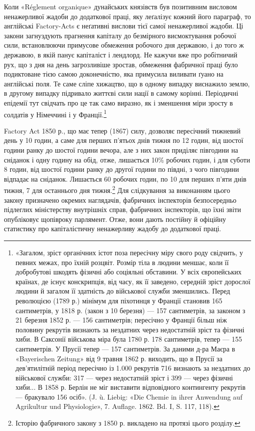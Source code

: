 Коли «Réglement organique» дунайських князівств був позитивним
висловом ненажерливої жадоби до додаткової праці, яку
леґалізує кожний його параграф, то англійські Factory-Acts
є неґативні вислови тієї самої ненажерливої жадоби. Ці закони
загнуздують прагнення капіталу до безмірного висмоктування
робочої сили, встановлюючи примусове обмеження робочого дня
державою, і до того ж державою, в якій панує капіталіст і лендлорд.
Не кажучи вже про робітничий рух, що з дня на день загрозливіше
зростав, обмеження фабричної праці було подиктоване
тією самою доконечністю, яка примусила виливати ґуано
на англійські поля. Те саме сліпе хижацтво, що в одному випадку
виснажило землю, в другому випадку підривало життєві сили
нації в самому корінні. Періодичні епідемії тут свідчать про це
так само виразно, як і зменшення міри зросту в солдатів у Німеччині
і у Франції.\footnote{
«Загалом, зріст органічних істот поза пересічну міру свого роду
свідчить, у певних межах, про їхній розцвіт. Розмір тіла в людини меншає,
коли її добробутові шкодять фізичні або соціяльні обставини. У всіх європейських
країнах, де існує конскрипція, від часу, як її заведено, середній
зріст дорослої людини й загалом її здатність до військової служби зменшились.
Перед революцією (1789 р.) мінімум для піхотинця у Франції
становив 165 сантиметрів, у 1818 р. (закон з 10 березня) — 157 сантиметрів,
за законом з 21 березня 1852 р. — 156 сантиметрів; пересічно у Франції
більш ніж половину рекрутів визнають за нездатних через недостатній
зріст та фізичні хиби. В Саксонії військова міра була 1780 р. 178 сантиметрів,
тепер — 155 сантиметрів. У Прусії тепер — 157 сантиметрів. За даними
д-ра Маєра в «Bayerischen Zeitung» від 9 травня 1862 р. виходить,
що в Прусії за дев’ятилітній період пересічно із 1.000 рекрутів 716 визнають
за нездатних до військової служби: 317 — через недостатній зріст і
399 — через фізичні хиби... В 1858 р. Берлін не міг виставити відповідного
контингенту рекрутів — бракувало 156 осіб». (J. ù. Liebig: «Die
Chemie in ihrer Anwendung auf Agrikultur und Physiologie», 7. Auflage.
1862. Bd. I, S. 117, 118).
}

Factory Act 1850 р., що має тепер (1867) силу, дозволяє пересічний
тижневий день у 10 годин, а саме для перших п’ятьох
днів тижня по 12 годин, від шостої години ранку до шостої години
вечора, але з них закон приділяє півгодини на сніданок і
одну годину на обід, отже, лишається 10\% робочих годин, і для
суботи 8 годин, від шостої години ранку до другої години по
півдні, з чого півгодини відпадає на сніданок. Лишається 60 робочих
годин, по 10 для перших п’яти днів тижня, 7 для
останнього дня тижня.\footnote{
Історію фабричного закону з 1850 р. викладено на протязі цього
розділу.
} Для слідкування за виконанням цього
закону призначено окремих наглядачів, фабричних інспекторів
безпосередньо підлеглих міністерству внутрішніх справ, фабричних
інспекторів, що їхні звіти опубліковує щопівроку парлямент.
Отже, вони дають постійну й офіційну статистику про капіталістичну
ненажерливу жадобу до додаткової праці.

